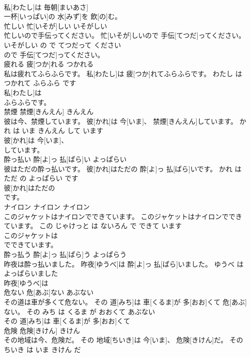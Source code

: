 \documentclass[8pt]{extreport}
\begin{document}
\begin{CJK}{UTF8}{min}
\\	私[わたし]は 毎朝[まいあさ]
\\	一杯[いっぱい]の 水[みず]を 飲[の]む。		
\\	忙しい	忙[いそが]しい	いそがしい	
\\	忙しいので手伝ってください。	忙[いそが]しいので 手伝[てつだ]ってください。	いそがしい の で てつだって ください	
\\	ので 手伝[てつだ]ってください。		
\\	疲れる	疲[つか]れる	つかれる	
\\	私は疲れてふらふらです。	私[わたし]は 疲[つか]れてふらふらです。	わたし は つかれて ふらふら です	
\\	私[わたし]は
\\	ふらふらです。		
\\	禁煙	禁煙[きんえん]	きんえん	
\\	彼は今、禁煙しています。	彼[かれ]は 今[いま]、 禁煙[きんえん]しています。	かれ は いま きんえん して います	
\\	彼[かれ]は 今[いま]、
\\	しています。		
\\	酔っ払い	酔[よ]っ 払[ぱら]い	よっぱらい	
\\	彼はただの酔っ払いです。	彼[かれ]はただの 酔[よ]っ 払[ぱら]いです。	かれ は ただ の よっぱらい です	
\\	彼[かれ]はただの
\\	です。		
\\	ナイロン	ナイロン	ナイロン	
\\	このジャケットはナイロンでできています。	このジャケットはナイロンでできています。	この じゃけっと は ないろん で できて います	
\\	このジャケットは
\\	でできています。		
\\	酔っ払う	酔[よ]っ 払[ぱら]う	よっぱらう	
\\	昨夜は酔っ払いました。	昨夜[ゆうべ]は 酔[よ]っ 払[ぱら]いました。	ゆうべ は よっぱらいました	
\\	昨夜[ゆうべ]は
\\	危ない	危[あぶ]ない	あぶない	
\\	その道は車が多くて危ない。	その 道[みち]は 車[くるま]が 多[おお]くて 危[あぶ]ない。	その みち は くるま が おおくて あぶない	
\\	その 道[みち]は 車[くるま]が 多[おお]くて
\\	危険	危険[きけん]	きけん	
\\	その地域は今、危険だ。	その 地域[ちいき]は 今[いま]、 危険[きけん]だ。	その ちいき は いま きけん だ	

\end{CJK}
\end{document}
